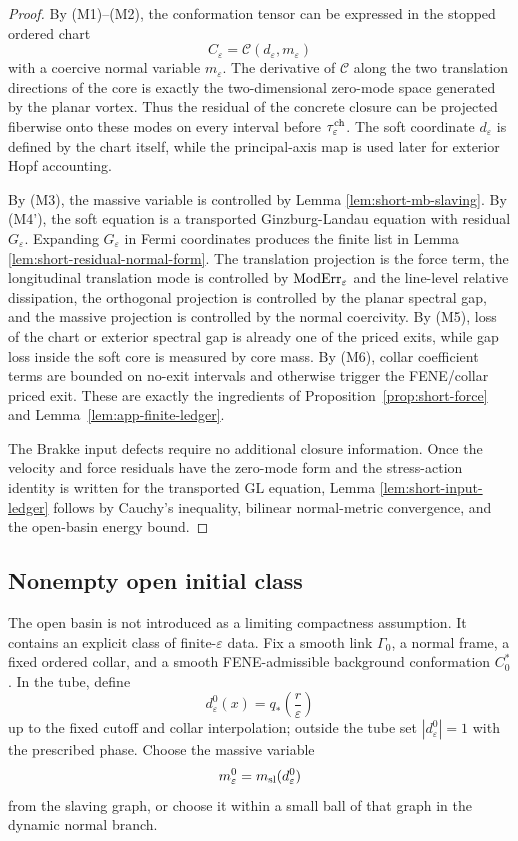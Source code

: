 \documentclass[11pt]{article}
\theoremstyle{definition}
\newcommand{\eps}{\varepsilon}
\begin{document}
\begin{proof}
By (M1)--(M2), the conformation tensor can be expressed in the stopped ordered
chart
\[
        C_\eps=\mathcal C(d_\eps,m_\eps)
\]
with a coercive normal variable \(m_\eps\).  The derivative of
\(\mathcal C\) along the two translation directions of the core is exactly the
two-dimensional zero-mode space generated by the planar vortex.  Thus the
residual of the concrete closure can be projected fiberwise onto these modes on
every interval before \(\tau_\eps^{\rm ch}\).  The soft coordinate \(d_\eps\) is defined by the chart itself, while the principal-axis map is used later for exterior Hopf accounting.

By (M3), the massive variable is controlled by Lemma
\ref{lem:short-mb-slaving}.  By (M4'), the soft equation is a transported
Ginzburg-Landau equation with residual \(G_\eps\).  Expanding \(G_\eps\) in
Fermi coordinates produces the finite list in Lemma
\ref{lem:short-residual-normal-form}.  The translation projection is the force
term, the longitudinal translation mode is controlled by \({\rm ModErr}_\eps\)
and the line-level relative dissipation, the orthogonal projection is controlled
by the planar spectral gap, and the massive projection is controlled by the
normal coercivity.  By (M5), loss
of the chart or exterior spectral gap is already one of the priced exits, while
gap loss inside the soft core is measured by core mass.  By (M6), collar
coefficient terms are bounded on no-exit intervals and otherwise trigger the
FENE/collar priced exit.  These are exactly the ingredients of
Proposition~\ref{prop:short-force} and Lemma~\ref{lem:app-finite-ledger}.

The Brakke input defects require no additional closure information.  Once the
velocity and force residuals have the zero-mode form and the stress-action
identity is written for the transported GL equation, Lemma
\ref{lem:short-input-ledger} follows by Cauchy's inequality, bilinear
normal-metric convergence, and the open-basin energy bound.
\end{proof}

\subsection{Nonempty open initial class}

The open basin is not introduced as a limiting compactness assumption.  It
contains an explicit class of finite-\(\eps\) data.  Fix a smooth link
\(\Gamma_0\), a normal frame, a fixed ordered collar, and a smooth
FENE-admissible background conformation \(C_0^\ast\).  In the tube, define
\[
        d_\eps^0(x)
        =
        q_\ast\!\left(\frac{r}{\eps}\right)
\]
up to the fixed cutoff and collar interpolation; outside the tube set
\(|d_\eps^0|=1\) with the prescribed phase.  Choose the massive variable
\[
        m_\eps^0=m_{\rm sl}(d_\eps^0)
\]
from the slaving graph, or choose it within a small ball of that graph in the
dynamic normal branch.
\end{document}
